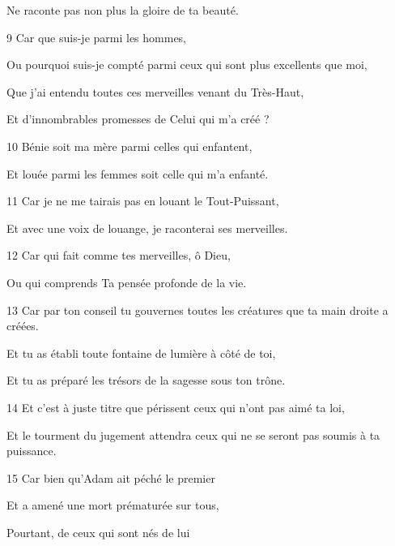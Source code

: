 \par Ne raconte pas non plus la gloire de ta beauté.

\par 9 Car que suis-je parmi les hommes,

\par Ou pourquoi suis-je compté parmi ceux qui sont plus excellents que moi,

\par Que j'ai entendu toutes ces merveilles venant du Très-Haut,

\par Et d'innombrables promesses de Celui qui m'a créé ?

\par 10 Bénie soit ma mère parmi celles qui enfantent,

\par Et louée parmi les femmes soit celle qui m'a enfanté.

\par 11 Car je ne me tairais pas en louant le Tout-Puissant,

\par Et avec une voix de louange, je raconterai ses merveilles.

\par 12 Car qui fait comme tes merveilles, ô Dieu,

\par Ou qui comprends Ta pensée profonde de la vie.

\par 13 Car par ton conseil tu gouvernes toutes les créatures que ta main droite a créées.

\par Et tu as établi toute fontaine de lumière à côté de toi,

\par Et tu as préparé les trésors de la sagesse sous ton trône.

\par 14 Et c'est à juste titre que périssent ceux qui n'ont pas aimé ta loi,

\par Et le tourment du jugement attendra ceux qui ne se seront pas soumis à ta puissance.

\par 15 Car bien qu'Adam ait péché le premier

\par Et a amené une mort prématurée sur tous,

\par Pourtant, de ceux qui sont nés de lui

